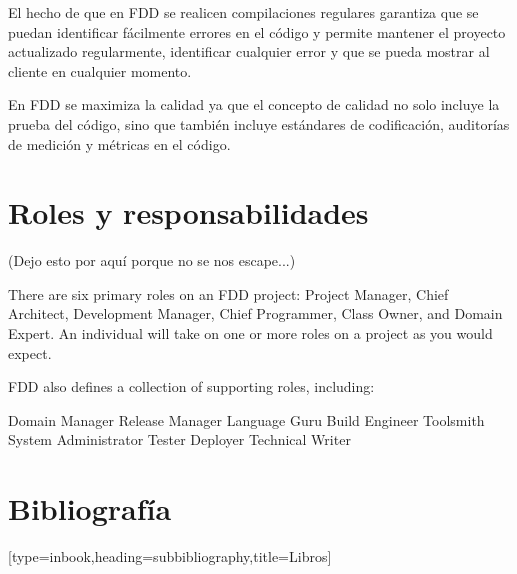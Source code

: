 \documentclass[11pt]{article}
\begin{document}
El hecho de que en FDD se realicen compilaciones regulares garantiza que se puedan identificar fácilmente errores en el código y permite mantener el proyecto actualizado regularmente, identificar cualquier error y que se pueda mostrar al cliente en cualquier momento. 

En FDD se maximiza la calidad ya que el concepto de calidad no solo incluye la prueba del código, sino que también incluye estándares de codificación, auditorías de medición y métricas en el código.

\section{Roles y responsabilidades}

(Dejo esto por aquí porque no se nos escape...)

There are six primary roles on an FDD project: Project Manager, Chief Architect, Development Manager, Chief Programmer, Class Owner, and Domain Expert. An individual will take on one or more roles on a project as you would expect.

FDD also defines a collection of supporting roles, including:

    Domain Manager
    Release Manager
    Language Guru
    Build Engineer
    Toolsmith
    System Administrator
    Tester
    Deployer
    Technical Writer


\newpage
\section{Bibliografía}
\nocite{*}


[type=inbook,heading=subbibliography,title={Libros}]
\end{document}
